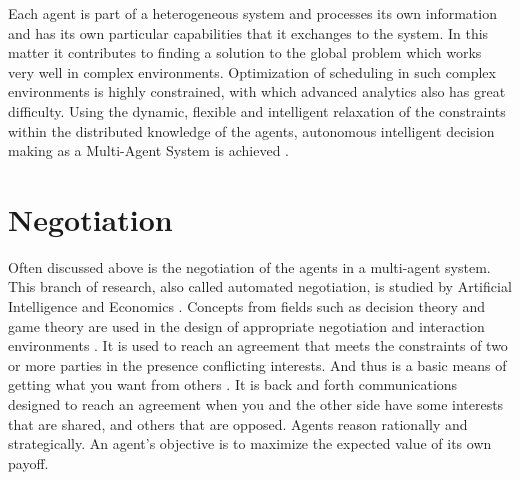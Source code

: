 Each agent is part of a heterogeneous system and processes its own information and has its own particular capabilities that it exchanges to the system. In this matter it contributes to finding a solution to the global problem which works very well in complex environments. Optimization of scheduling in such complex environments is highly constrained, with which advanced analytics also has great difficulty. Using the dynamic, flexible and intelligent relaxation of the constraints within the distributed knowledge of the agents, autonomous intelligent decision making as a Multi-Agent System is achieved \citep{rabelo1999multi}. 




\clearpage
\section{Negotiation}
\label{sec:negotiation}
Often discussed above is the negotiation of the agents in a multi-agent system. This branch of research, also called automated negotiation, is studied by Artificial Intelligence and Economics \citep{jennings2001automated}. Concepts from fields such as decision theory and game theory are used in the design of appropriate negotiation and interaction environments \citep{jennings2001automated}. It is used to reach an agreement that meets the constraints of two or more parties in the presence conflicting interests. And thus is a basic means of getting what you want from others \citep{fisher1987getting}. It is back and forth communications designed to reach an agreement when you and the other side have some interests that are shared, and others that are opposed. Agents reason rationally and strategically. An agent's objective is to maximize the expected value of its own payoff. 

